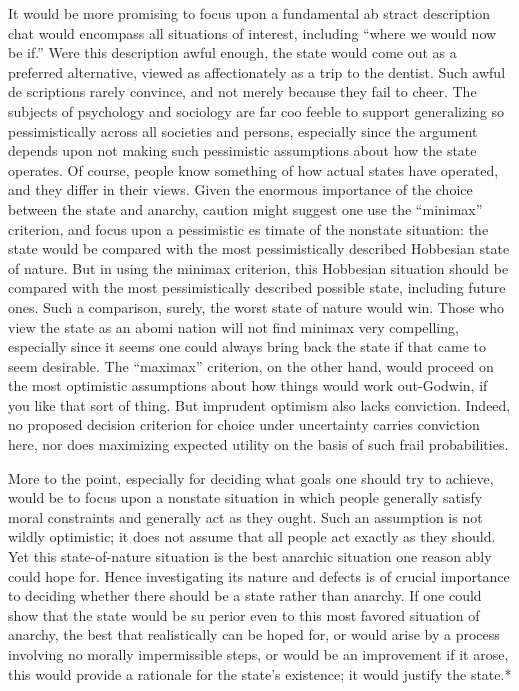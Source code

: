\documentclass[11pt,openany]{book}
\begin{document}
It would be more promising to focus upon a fundamental ab stract description chat would encompass all situations of interest, including ``where we would now be if.'' Were this description awful enough, the state would come out as a preferred alternative, viewed as affectionately as a trip to the dentist. Such awful de scriptions rarely convince, and not merely because they fail to cheer. The subjects of psychology and sociology are far coo feeble to support generalizing so pessimistically across all societies and persons, especially since the argument depends upon not making such pessimistic assumptions about how the state operates. Of course, people know something of how actual states have operated, and they differ in their views. Given the enormous importance of the choice between the state and anarchy, caution might suggest one use the ``minimax'' criterion, and focus upon a pessimistic es timate of the nonstate situation: the state would be compared with the most pessimistically described Hobbesian state of nature. But in using the minimax criterion, this Hobbesian situation should be compared with the most pessimistically described possible state, including future ones. Such a comparison, surely, the worst state of nature would win. Those who view the state as an abomi nation will not find minimax very compelling, especially since it seems one could always bring back the state if that came to seem desirable. The ``maximax'' criterion, on the other hand, would proceed on the most optimistic assumptions about how things would work out-Godwin, if you like that sort of thing. But imprudent optimism also lacks conviction. Indeed, no proposed decision criterion for choice under uncertainty carries conviction here, nor does maximizing expected utility on the basis of such frail probabilities. 

More to the point, especially for deciding what goals one should try to achieve, would be to focus upon a nonstate situation in which people generally satisfy moral constraints and generally act as they ought. Such an assumption is not wildly optimistic; it does not assume that all people act exactly as they should. Yet this state-of-nature situation is the best anarchic situation one reason ably could hope for. Hence investigating its nature and defects is of crucial importance to deciding whether there should be a state rather than anarchy. If one could show that the state would be su perior even to this most favored situation of anarchy, the best that realistically can be hoped for, or would arise by a process involving no morally impermissible steps, or would be an improvement if it arose, this would provide a rationale for the state's existence; it would justify the state.* 
\end{document}
